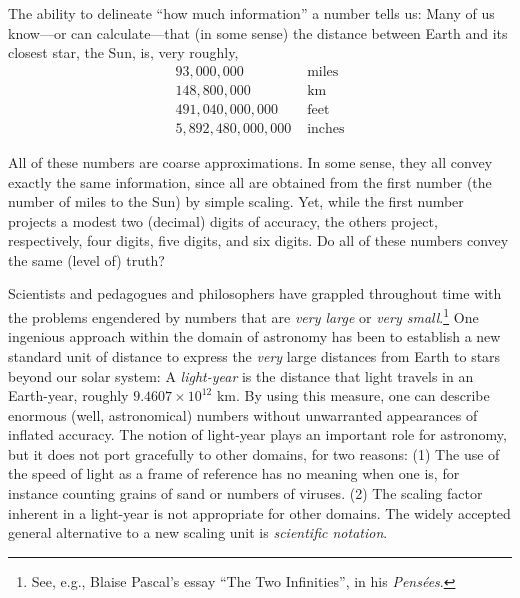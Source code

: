 The ability to delineate ``how much information'' a number tells us:  Many of us know---or can calculate---that (in some sense) the distance between Earth and its closest star, the Sun, is, very roughly,
\[ \begin{array}{rl}
93,000,000 & \mbox{ miles} \\
148,800,000 & \mbox{ km} \\
491,040,000,000 & \mbox{ feet} \\
5,892,480,000,000 & \mbox{ inches}
\end{array}
\]

\medskip

\noindent {}

\bigskip

All of these numbers are coarse approximations.  In some sense, they all convey exactly the same information, since all are obtained from the first number (the number of miles to the Sun) by simple scaling.  Yet, while the first number projects a modest two (decimal) digits of accuracy, the others project, respectively, four digits, five digits, and six digits.  Do all of these numbers convey the same (level of) truth?

\medskip


Scientists and pedagogues and philosophers have grappled throughout time with the problems engendered by numbers that are {\em very large} or {\em very small}.\footnote{See, e.g., Blaise Pascal's essay ``The Two Infinities'', in his {\it Pens\'{e}es}.}  One ingenious approach within the domain of astronomy has been to establish a new standard unit of distance to express the {\em very} large distances from Earth to stars beyond our solar system: A {\em light-year} is the distance that light travels in an Earth-year, roughly $9.4607 \times 10^{12}$ km.  By using this measure, one can describe enormous (well, astronomical) numbers without unwarranted appearances of inflated accuracy.  The notion of light-year plays an important role for astronomy, but it does not port gracefully to other domains, for two reasons: (1) The use of the speed of light as a frame of reference has no meaning when one is, for instance counting grains of sand or numbers of viruses.  (2) The scaling factor inherent in a light-year is not appropriate for other
domains.  The widely accepted general alternative to a new scaling unit is {\em scientific notation}.  

